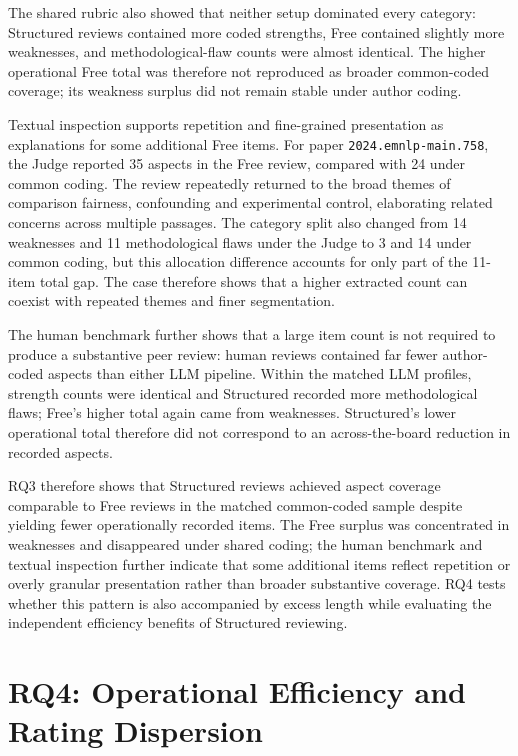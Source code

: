 The shared rubric also showed that neither setup dominated every category: Structured reviews contained more coded strengths, Free contained slightly more weaknesses, and methodological-flaw counts were almost identical. The higher operational Free total was therefore not reproduced as broader common-coded coverage; its weakness surplus did not remain stable under author coding.

Textual inspection supports repetition and fine-grained presentation as explanations for some additional Free items. For paper \texttt{2024.emnlp-main.758}, the Judge reported 35 aspects in the Free review, compared with 24 under common coding. The review repeatedly returned to the broad themes of comparison fairness, confounding and experimental control, elaborating related concerns across multiple passages. The category split also changed from 14 weaknesses and 11 methodological flaws under the Judge to 3 and 14 under common coding, but this allocation difference accounts for only part of the 11-item total gap. The case therefore shows that a higher extracted count can coexist with repeated themes and finer segmentation.

The human benchmark further shows that a large item count is not required to produce a substantive peer review: human reviews contained far fewer author-coded aspects than either LLM pipeline. Within the matched LLM profiles, strength counts were identical and Structured recorded more methodological flaws; Free's higher total again came from weaknesses. Structured's lower operational total therefore did not correspond to an across-the-board reduction in recorded aspects.

RQ3 therefore shows that Structured reviews achieved aspect coverage comparable to Free reviews in the matched common-coded sample despite yielding fewer operationally recorded items. The Free surplus was concentrated in weaknesses and disappeared under shared coding; the human benchmark and textual inspection further indicate that some additional items reflect repetition or overly granular presentation rather than broader substantive coverage. RQ4 tests whether this pattern is also accompanied by excess length while evaluating the independent efficiency benefits of Structured reviewing.

\section{RQ4: Operational Efficiency and Rating Dispersion}
\label{sec:rq4}

